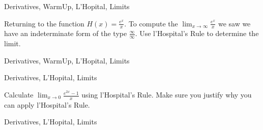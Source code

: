 \begin{tagblock}{Derivatives, WarmUp, L'Hopital, Limits }
\begin{question}
\bigskip


Returning to the function $\displaystyle H(x) = \frac{e^x}{x}$.  To compute the $\displaystyle \lim_{x \to \infty}  \frac{e^x}{x}$ we saw we have an indeterminate form of the type $\frac{\infty}{\infty}$.  Use  l'Hospital's Rule to determine the limit.


	
\begin{tags}
	   Derivatives, WarmUp, L'Hopital, Limits

\end{tags}
	
\begin{diary}
\end{diary}
	
\begin{solution}
	   
\end{solution}
	
\end{question}

\end{tagblock}


\begin{tagblock}{Derivatives, L'Hopital, Limits }

\begin{question}

Calculate $\displaystyle  \lim_{x \to 0} \frac{e^{2x}-1}{x}$ using l'Hospital's Rule.  Make sure you justify why you can apply  l'Hospital's Rule.


	
\begin{tags}
	   Derivatives, L'Hopital, Limits

\end{tags}
	
\begin{diary}
\end{diary}
	
\begin{solution}
	   
\end{solution}
	
\end{question}

\end{tagblock}

